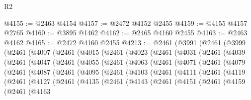 \begin{lexlean}{R2}
\begin{coremodule}
@4155 := @2463 @4154
@4157 := @2472 @4152 @2455
@4159 := @4155 @4157 @2765
@4160 := @3895 @1462
@4162 := @2465 @4160 @2455
@4163 := @2463 @4162
@4165 := @2472 @4160 @2455
@4213 := @2461
    (@3991
      (@2461
        (@3999
          (@2461
            (@4007
              (@2461
                (@4015
                  (@2461
                    (@4023
                      (@2461
                        (@4031
                          (@2461
                            (@4039
                              (@2461
                                (@4047
                                  (@2461
                                    (@4055
                                      (@2461
                                        (@4063
                                          (@2461
                                            (@4071
                                              (@2461
                                                (@4079
                                                  (@2461
                                                    (@4087
                                                      (@2461
                                                        (@4095
                                                          (@2461
                                                            (@4103
                                                              (@2461
                                                                (@4111
                                                                  (@2461
                                                                    (@4119
                                                                      (@2461
                                                                        (@4127
                                                                          (@2461
                                                                            (@4135
                                                                              (@2461
                                                                                (@4143
                                                                                  (@2461
                                                                                    (@4151
                                                                                      (@2461
                                                                                        (@4159
                                                                                          (@2461
                                                                                            (@4163

\end{coremodule}
\end{lexlean}
